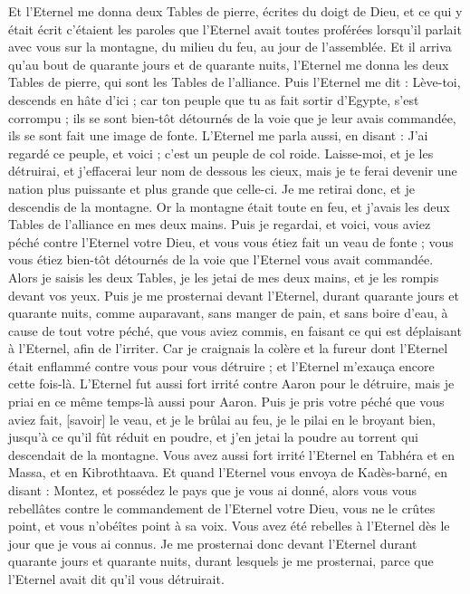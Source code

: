 \begin{multicols}{2}
Et l'Eternel me donna deux Tables de pierre, écrites du doigt de Dieu, et ce qui y était écrit c'étaient les paroles que l'Eternel avait toutes proférées lorsqu'il parlait avec vous sur la montagne, du milieu du feu, au jour de l'assemblée.
Et il arriva qu'au bout de quarante jours et de quarante nuits, l'Eternel me donna les deux Tables de pierre, qui sont les Tables de l'alliance.
Puis l'Eternel me dit : Lève-toi, descends en hâte d'ici ; car ton peuple que tu as fait sortir d'Egypte, s'est corrompu ; ils se sont bien-tôt détournés de la voie que je leur avais commandée, ils se sont fait une image de fonte.
L'Eternel me parla aussi, en disant : J'ai regardé ce peuple, et voici ; c'est un peuple de col roide.
Laisse-moi, et je les détruirai, et j'effacerai leur nom de dessous les cieux, mais je te ferai devenir une nation plus puissante et plus grande que celle-ci.
Je me retirai donc, et je descendis de la montagne. Or la montagne était toute en feu, et j'avais les deux Tables de l'alliance en mes deux mains.
Puis je regardai, et voici, vous aviez péché contre l'Eternel votre Dieu, et vous vous étiez fait un veau de fonte ; vous vous étiez bien-tôt détournés de la voie que l'Eternel vous avait commandée.
Alors je saisis les deux Tables, je les jetai de mes deux mains, et je les rompis devant vos yeux.
Puis je me prosternai devant l'Eternel, durant quarante jours et quarante nuits, comme auparavant, sans manger de pain, et sans boire d'eau, à cause de tout votre péché, que vous aviez commis, en faisant ce qui est déplaisant à l'Eternel, afin de l'irriter.
Car je craignais la colère et la fureur dont l'Eternel était enflammé contre vous pour vous détruire ; et l'Eternel m'exauça encore cette fois-là.
L'Eternel fut aussi fort irrité contre Aaron pour le détruire, mais je priai en ce même temps-là aussi pour Aaron.
Puis je pris votre péché que vous aviez fait, [savoir] le veau, et je le brûlai au feu, je le pilai en le broyant bien, jusqu'à ce qu'il fût réduit en poudre, et j'en jetai la poudre au torrent qui descendait de la montagne.
Vous avez aussi fort irrité l'Eternel en Tabhéra et en Massa, et en Kibrothtaava.
Et quand l'Eternel vous envoya de Kadès-barné, en disant : Montez, et possédez le pays que je vous ai donné, alors vous vous rebellâtes contre le commandement de l'Eternel votre Dieu, vous ne le crûtes point, et vous n'obéîtes point à sa voix.
Vous avez été rebelles à l'Eternel dès le jour que je vous ai connus.
Je me prosternai donc devant l'Eternel durant quarante jours et quarante nuits, durant lesquels je me prosternai, parce que l'Eternel avait dit qu'il vous détruirait.

\end{multicols}
